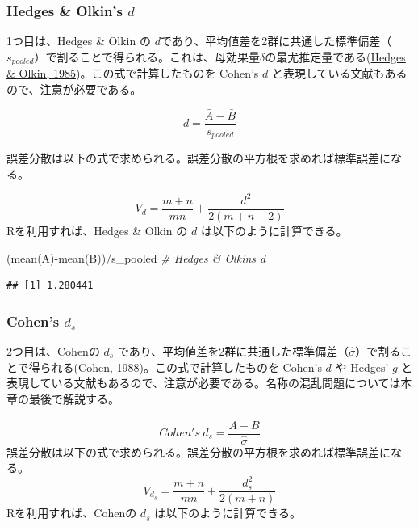\documentclass[
  ja=standard, xelatex, base=12pt]{bxjsreport}
\newenvironment{Shaded}{\begin{snugshade}}{\end{snugshade}}
\newcommand{\CommentTok}[1]{\textcolor[rgb]{0.56,0.35,0.01}{\textit{#1}}}
\newcommand{\FunctionTok}[1]{\textcolor[rgb]{0.00,0.00,0.00}{#1}}
\newcommand{\NormalTok}[1]{#1}
\newcommand{\SpecialCharTok}[1]{\textcolor[rgb]{0.00,0.00,0.00}{#1}}
\begin{document}
\hypertarget{hedges-olkins-d}{%
\subsubsection{\texorpdfstring{Hedges \& Olkin's \(d\)}{Hedges \& Olkin's d}}\label{hedges-olkins-d}}

1つ目は、Hedges \& Olkin の \(d\)であり、平均値差を2群に共通した標準偏差（\(s_{pooled}\)）で割ることで得られる。これは、母効果量\(\delta\)の最尤推定量である(\protect\hyperlink{ref-hedges1985}{Hedges \& Olkin, 1985})。この式で計算したものを Cohen's \(d\) と表現している文献もあるので、注意が必要である。

\[
d =\frac{\bar{A}-\bar{B}}{s_{pooled}} 
\]

誤差分散は以下の式で求められる。誤差分散の平方根を求めれば標準誤差になる。

\[
V_d=\frac{m+n}{mn}+\frac{d^2}{2(m+n-2)}
\] Rを利用すれば、Hedges \& Olkin の \(d\) は以下のように計算できる。

\begin{Shaded}
\begin{Highlighting}[]
\NormalTok{(}\FunctionTok{mean}\NormalTok{(A)}\SpecialCharTok{{-}}\FunctionTok{mean}\NormalTok{(B))}\SpecialCharTok{/}\NormalTok{s\_pooled  }\CommentTok{\# Hedges \& Olkin\textquotesingle{}s d}
\end{Highlighting}
\end{Shaded}

\begin{verbatim}
## [1] 1.280441
\end{verbatim}

\hypertarget{cohens-d_s}{%
\subsubsection{\texorpdfstring{Cohen's \(d_s\)}{Cohen's d\_s}}\label{cohens-d_s}}

2つ目は、Cohenの \(d_s\) であり、平均値差を2群に共通した標準偏差（\(\hat\sigma\)）で割ることで得られる(\protect\hyperlink{ref-cohen1988}{Cohen, 1988})。この式で計算したものを Cohen's \(d\) や Hedges' \(g\) と表現している文献もあるので、注意が必要である。名称の混乱問題については本章の最後で解説する。

\[
Cohen's~d_s =\frac{\bar{A}-\bar{B}}{\hat\sigma} 
\] 誤差分散は以下の式で求められる。誤差分散の平方根を求めれば標準誤差になる。 \[
V_{d_s}=\frac{m+n}{mn}+\frac {d_s^2}{2(m+n)} 
\] Rを利用すれば、Cohenの \(d_s\) は以下のように計算できる。
\end{document}
